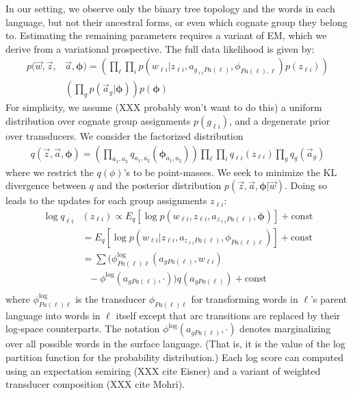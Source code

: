 \documentclass[11pt]{article}
\begin{document}
In our setting, we observe only the binary tree topology and the words in each language, but not their ancestral forms, or even which cognate group they belong to. Estimating
the remaining parameters requires a variant of EM, which we derive from a variational prospective. The full data likelihood is given by:
\begin{equation}
  \begin{split}
    p(\vec w, \vec z, &\vec a, \mathbf{\phi}) = (\prod_\ell \prod_i p(w_{\ell
    i}|z_{\ell i},a_{g_{\ell i}Pa(\ell)},\phi_{Pa(\ell),\ell})p(z_{\ell i}))\\
      & (\prod_g p(\vec a_g|\mathbf{\phi}) ) p(\mathbf{\phi})
   \end{split}
 \end{equation}
 For simplicity, we assume (XXX probably won't want to do this) a uniform distribution over cognate group assignments $p(g_{\ell i })$, and a degenerate prior over
 transducers.
 We consider the factorized distribution 
 \begin{equation}
   \begin{split}
      q(\vec z, \vec a, \mathbf{\phi}) = (\prod_{a_1,a_2} q_{a_1,a_2}(\mathbf{\phi}_{a_1,a_2}))\prod_\ell \prod_i q_{\ell i}(z_{\ell i})\prod_g
 q_g(\vec a_g)
    \end{split}
  \end{equation}
 where we restrict the $q(\phi)$'s to be point-masses. We seek to
 minimize the KL divergence between $q$ and the posterior distribution $p(\vec z,
 \vec a, \mathbf{\phi}| \vec w)$. Doing so leads to the updates for each group
 assignments $z_{\ell i}$:
 \begin{equation}
   \begin{split}
     \log q_{\ell i}&(z_{\ell i}) \propto E_q[\log p(w_{\ell i}, z_{\ell i}, a_{z_{\ell i} Pa(\ell)},\mathbf{\phi})] + \mathrm{const}\\
     &= E_q[\log  p(w_{\ell i}|z_{\ell i},a_{z_{\ell i}Pa(\ell)},\phi_{Pa(\ell)\ell}) ] + \mathrm{const}\\
     &= \sum (\phi^{\log}_{Pa(\ell)\ell}(a_{gPa(\ell)},w_{\ell i}) \\
     &~ ~ ~ - \phi^{\log}(a_{gPa(\ell)},\cdot))q(a_{gPa(\ell)}) + \mathrm{const}\\
    \end{split}
  \end{equation}
where $\phi^{\log}_{Pa(\ell)\ell}$ is the transducer
$\phi_{Pa(\ell)\ell}$ for transforming words in $\ell$'s parent
language into words in $\ell$ itself except that arc transitions
are replaced by their log-space counterparts. The notation $\phi^{\log}(a_{gPa(\ell)},\cdot)$
denotes marginalizing over all possible words in the surface language. (That is, it is
the value of the log partition function for the probability distribution.)
Each log score
can computed using an expectation semiring (XXX cite Eisner) and a
variant of weighted transducer composition (XXX cite Mohri). 
\end{document}
